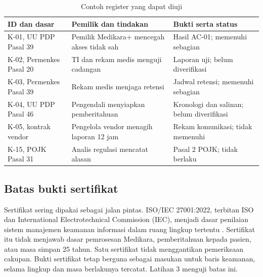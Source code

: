 \begin{table}[!htb]
  \centering\small
  \caption{Contoh register yang dapat diuji}\label{tab:ch03-register}
  \begin{tabularx}{\textwidth}{|>{\raggedright\arraybackslash}p{}|>{\raggedright\arraybackslash}X|>{\raggedright\arraybackslash}X|}
    \hline
    \textbf{ID dan dasar} & \textbf{Pemilik dan tindakan} & \textbf{Bukti serta status} \\ \hline
    K-01, UU PDP Pasal 39 & Pemilik Medikara+ mencegah akses tidak sah & Hasil AC-01; memenuhi sebagian \\ \hline
    K-02, Permenkes Pasal 20 & TI dan rekam medis menguji cadangan & Laporan uji; belum diverifikasi \\ \hline
    K-03, Permenkes Pasal 39 & Rekam medis menjaga retensi & Jadwal retensi; memenuhi sebagian \\ \hline
    K-04, UU PDP Pasal 46 & Pengendali menyiapkan pemberitahuan & Kronologi dan salinan; belum diverifikasi \\
    \hline
    K-05, kontrak vendor & Pengelola vendor menagih laporan 12 jam & Rekam komunikasi; tidak memenuhi \\ \hline
    K-15, POJK Pasal 31 & Analis regulasi mencatat alasan & Pasal 2 POJK; tidak berlaku \\ \hline
  \end{tabularx}
\end{table}

\subsection*{Batas bukti sertifikat}

Sertifikat sering dipakai sebagai jalan pintas. ISO/IEC 27001:2022, terbitan ISO dan International Electrotechnical
Commission (IEC), menjadi dasar penilaian sistem manajemen keamanan informasi dalam ruang lingkup tertentu
\cite{iso27001-2022}. Sertifikat itu tidak menjawab dasar pemrosesan Medikara, pemberitahuan kepada pasien, atau
masa simpan 25 tahun. Satu sertifikat
tidak menggantikan pemeriksaan cakupan. Bukti sertifikat tetap berguna sebagai masukan untuk baris keamanan, selama
lingkup dan masa berlakunya tercatat. Latihan 3 menguji batas ini.

